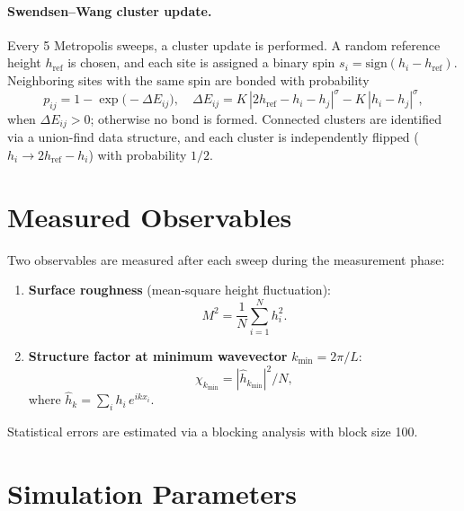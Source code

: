 \documentclass[11pt,a4paper]{article}
\begin{document}
\paragraph{Swendsen--Wang cluster update.}
Every 5 Metropolis sweeps, a cluster update is performed.
A random reference height $h_{\mathrm{ref}}$ is chosen, and each site is
assigned a binary spin $s_i = \mathrm{sign}(h_i - h_{\mathrm{ref}})$.
Neighboring sites with the same spin are bonded with probability
\begin{equation}
  p_{ij} = 1 - \exp\!\bigl(-\Delta E_{ij}\bigr),
  \quad
  \Delta E_{ij} = K\,|2h_{\mathrm{ref}} - h_i - h_j|^{\sigma}
                - K\,|h_i - h_j|^{\sigma},
\end{equation}
when $\Delta E_{ij}>0$; otherwise no bond is formed.
Connected clusters are identified via a union-find data structure,
and each cluster is independently flipped ($h_i \to 2h_{\mathrm{ref}} - h_i$)
with probability $1/2$.

\section{Measured Observables}

Two observables are measured after each sweep during the measurement phase:

\begin{enumerate}
\item \textbf{Surface roughness} (mean-square height fluctuation):
\begin{equation}
  M^2 = \frac{1}{N}\sum_{i=1}^{N} h_i^2.
\end{equation}

\item \textbf{Structure factor at minimum wavevector} $k_{\min}=2\pi/L$:
\begin{equation}
  \chi_{k_{\min}} = |\hat{h}_{k_{\min}}|^2 / N,
\end{equation}
where $\hat{h}_k = \sum_i h_i\, e^{i k x_i}$.
\end{enumerate}

Statistical errors are estimated via a blocking analysis with block size 100.

\section{Simulation Parameters}
\end{document}
